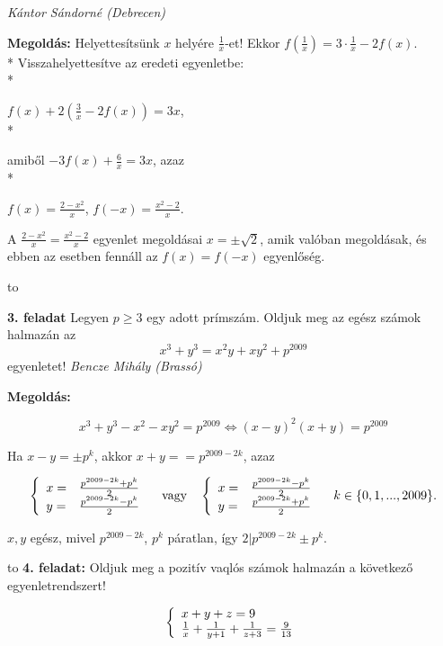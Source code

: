 \documentclass[a4paper,10pt]{article}
\def\ki#1#2{\hfill {\it #1 (#2)}\medskip}
\begin{document}
\ki{Kántor Sándorné}{Debrecen}

{\bf Megoldás:} Helyettesítsünk $x$ helyére $\frac{1}{x}$-et! Ekkor $f(\frac{1}{x})=3\cdot \frac{1}{x}-2f(x)$. \\*
Visszahelyettesítve az eredeti egyenletbe: \\*
\begin{center}
$f(x)+2(\frac{3}{x}-2f(x))=3x$, \\*
\end{center}
amiből $-3f(x)+\frac{6}{x}=3x$, azaz \\*
\begin{center}
$f(x)=\frac{2-x^2}{x}$, $f(-x)=\frac{x^2-2}{x}$.
\end{center}

A $\frac{2-x^2}{x}=\frac{x^2-2}{x}$ egyenlet megoldásai $x=\pm\sqrt{2}$, amik valóban megoldásak, és ebben az esetben fennáll az $f(x)=f(-x)$ egyenlőség.

\medskip
\hbox to 

{\bf 3. feladat} Legyen $p\ge3$ egy adott prímszám. Oldjuk meg az egész számok halmazán az
$$x^3+y^3=x^2y+xy^2+p^2009$$
egyenletet!
\ki{Bencze Mihály}{Brassó}

{\bf Megoldás: }

$$x^3+y^3-x^2-xy^2=p^{2009} \Leftrightarrow (x-y)^2(x+y)=p^{2009}$$

Ha $x-y=\pm p^k$, akkor $x+y==p^{2009-2k}$, azaz


$$\left\{ 
  \begin{array}{l l}
    x= & \frac{p^{2009-2k}+p^k}{2} \\
    y= & \frac{p^{2009-2k}-p^k}{2}
  \end{array} \right.
  \quad
  \mbox{vagy}
  \quad
  \left\{ 
  \begin{array}{l l}
    x= & \frac{p^{2009-2k}-p^k}{2} \\
    y= & \frac{p^{2009-2k}+p^k}{2}
  \end{array} \right.
  \quad
  k\in \{0,1,...,2009\}.
  $$
  
$x, y$ egész, mivel $p^{2009-2k}$, $p^k$ páratlan, így $2|p^{2009-2k}\pm p^k$.

\medskip
\hbox to 
{\bf 4. feladat:} Oldjuk meg a pozitív vaqlós számok halmazán a következő egyenletrendszert!

$$\left\{ 
  \begin{array}{l l}
    x+y+z=9 \\
    \frac{1}{x}+\frac{1}{y+1}+\frac{1}{z+3}=\frac{9}{13}
  \end{array} \right.$$
\end{document}
